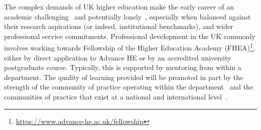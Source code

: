 \documentclass[sigconf]{acmart}
\begin{document}
The complex demands of UK higher education
make the early career of an academic challenging~\cite{Thomas2015}
and potentially lonely~\cite{Foote2009}, especially when balanced
against their research aspirations (or indeed, institutional benchmarks), and wider
professional service commitments. Professional development in the UK
commonly involves working towards Fellowship of the Higher Education
Academy
(FHEA)\footnote{\url{https://www.advance-he.ac.uk/fellowship}}, either
by direct application to Advance HE or by an accredited university
postgraduate course. Typically, this is supported by mentoring from
within a department. The quality of learning provided will be promoted
in part by the strength of the community of practice operating within
the department~\cite{Bolander2008} and the communities of practice
that exist at a national and international level~\cite{Thomas2015}.
\end{document}
